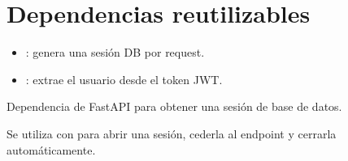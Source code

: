 \documentclass[letterpaper,10pt,spanish]{sphinxmanual}
\begin{document}
\section{Dependencias reutilizables}
\label{\detokenize{configuracion:dependencias-reutilizables}}\begin{itemize}
\item {} 
\sphinxAtStartPar
{}: genera una sesión DB por request.

\item {} 
\sphinxAtStartPar
{}: extrae el usuario desde el token JWT.

\end{itemize}
\label{\detokenize{configuracion:module-main}}

\begin{fulllineitems}
\label{\detokenize{configuracion:main.get_db}}
\pysigstartsignatures
\pysiglinewithargsret
{}
{}
{}
\pysigstopsignatures
\sphinxAtStartPar
Dependencia de FastAPI para obtener una sesión de base de datos.

\sphinxAtStartPar
Se utiliza con  para abrir una sesión, cederla al endpoint y cerrarla automáticamente.

\end{fulllineitems}



\renewcommand{\indexname}{Índice de Módulos Python}
\begin{sphinxtheindex}
\let\bigletter\sphinxstyleindexlettergroup
\bigletter{m}
\item\relax{}
\end{sphinxtheindex}

\renewcommand{\indexname}{Índice}
\printindex
\end{document}
